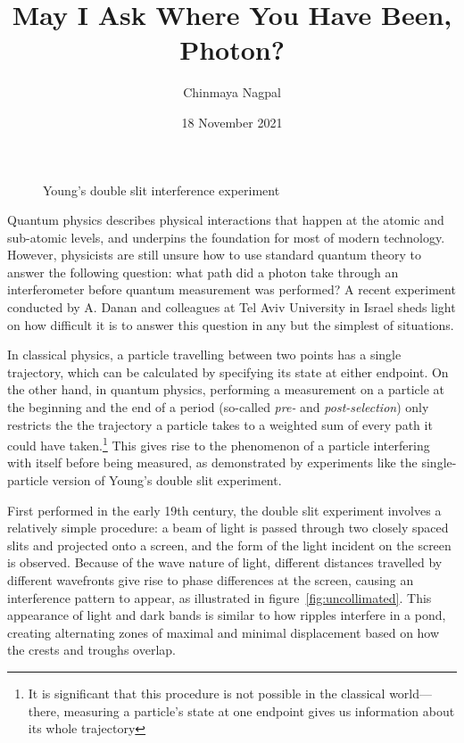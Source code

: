 \documentclass{article}
\author{Chinmaya Nagpal}
\title{May I Ask Where You Have Been, Photon?}
\date{18 November 2021}
\begin{document}
\maketitle

\begin{figure}[ht]
	\hspace*{\fill}
	\caption{Young's double slit interference experiment}
	\label{fig:double-slit}
\end{figure}

Quantum physics describes physical interactions that happen at the atomic and
sub-atomic levels, and underpins the foundation for most of modern technology.
However, physicists are still unsure how to use standard quantum theory to 
answer the following question: what path did a photon take through an 
interferometer before quantum measurement was performed?  A recent experiment 
conducted by A. Danan and colleagues at Tel Aviv University in Israel sheds 
light on how difficult it is to answer this question in any but the simplest of 
situations. 

In classical physics, a particle travelling between two points has a single
trajectory, which can be calculated by specifying its state at either endpoint.  
On the other hand, in quantum physics, performing a measurement on a particle 
at the beginning and the end of a period (so-called \textit{pre-} and 
\textit{post-selection}) only restricts the the trajectory a particle takes to 
a weighted sum of every path it could have taken.\footnote{It is significant 
that this procedure is not possible in the classical world---there, measuring a 
particle's state at one endpoint gives us information about its whole 
trajectory} This gives rise to the phenomenon of a particle interfering with 
itself before being measured, as demonstrated by experiments like the 
single-particle version of Young's double slit experiment. 

First performed in the early 19th century, the double slit experiment involves 
a relatively simple procedure: a beam of light is passed through two closely 
spaced slits and projected onto a screen, and the form of the light incident on 
the screen is observed. Because of the wave nature of light, different 
distances travelled by different wavefronts give rise to phase differences at 
the screen, causing an interference pattern to appear, as illustrated in 
figure~\ref{fig:uncollimated}. This appearance of light and dark bands is 
similar to how ripples interfere in a pond, creating alternating zones of 
maximal and minimal displacement based on how the crests and troughs overlap.
\end{document}

